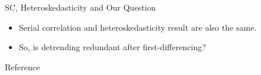 \documentclass[compress]{beamer}
\begin{document}
\begin{frame}{SC, Heteroskedasticity and Our Question}
  \begin{itemize}
    \item Serial correlation and heteroskedasticity result are also the same.
    \item So, is detrending redundant after first-differencing?
  \end{itemize}

\end{frame}

\begin{frame}[allowframebreaks]{Reference}
  \printbibliography
\end{frame}
\end{document}
